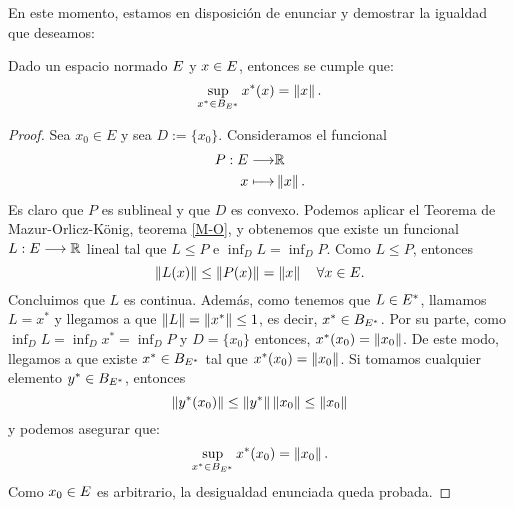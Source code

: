 En este momento, estamos en disposición de enunciar y demostrar la igualdad que deseamos:

\bigskip
\begin{corolarioBox}\label{iguSupNor}
	Dado un espacio normado $ E $ y $ x \in E $, entonces se cumple que:
	\begin{equation}\label{iguNorm}
	\sup_{x^* \in B_{E ^ *}} x^*(x) = \left\Vert x\right\Vert.
	\end{equation}
\end{corolarioBox}
\begin{proof}
	Sea $ x_0 \in E$ y sea $ D := \{x_0\} $. Consideramos el funcional 
	\begin{equation*}
	\begin{split}
	P:E \longrightarrow &\mathbb{R} \\
	x \longmapsto &\left\Vert x\right\Vert.
	\end{split}
	\end{equation*} 
	Es claro que $ P $ es sublineal y que $ D $ es convexo. Podemos aplicar el Teorema de Mazur-Orlicz-König, teorema \ref{M-O}, y obtenemos que existe un funcional $ L:E \longrightarrow \mathbb{R} $ lineal tal que $ L \leq P $ e $ \inf_D L = \inf_D P $. Como $ L \leq P $, entonces 
	\begin{equation*}
	\left\Vert L(x)\right\Vert \leq \left\Vert P(x)\right\Vert = \left\Vert x\right\Vert \quad \forall x \in E.
	\end{equation*}
	Concluimos que $ L $ es continua. Además, como tenemos que $ L \in E ^* $, llamamos $ L = x^* $ y llegamos a que $ \left\Vert L\right\Vert = \left\Vert x^*\right\Vert  \leq 1$, es decir, $ x^* \in  B_{E ^ *} $.  Por su parte, como  $ \inf_D L = \inf_D x^* = \inf_D P $ y $ D = \{x_0\} $ entonces, $ x^*(x_0) = \left\Vert x_0\right\Vert $. De este modo, llegamos a que existe $ x^* \in B_{E^*} $ tal que $ x^*(x_0) = \left\Vert x_0\right\Vert $. Si tomamos cualquier elemento $ y^* \in B_{E^*}  $, entonces \[ \left\Vert y^*(x_0)\right\Vert \leq \left\Vert y^*\right\Vert \left\Vert x_0\right\Vert \leq \left\Vert x_0\right\Vert \] y podemos asegurar que:
	\[
	\sup_{x^* \in B_{E ^ *}} x^*(x_0) = \left\Vert x_0\right\Vert.
	\] 
	Como $ x_0 \in E $ es arbitrario, la desigualdad enunciada queda probada.
\end{proof}
\bigskip
